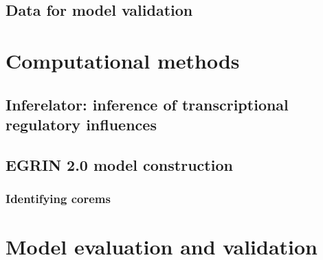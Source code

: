 \documentclass[11pt]{article}
\begin{document}


\subsection{Data for model validation}



\section{Computational methods}



\subsection{Inferelator: inference of transcriptional regulatory influences}



\subsection{EGRIN 2.0 model construction}



\subsubsection{Identifying corems}





\section{Model evaluation and validation}





\end{document}
